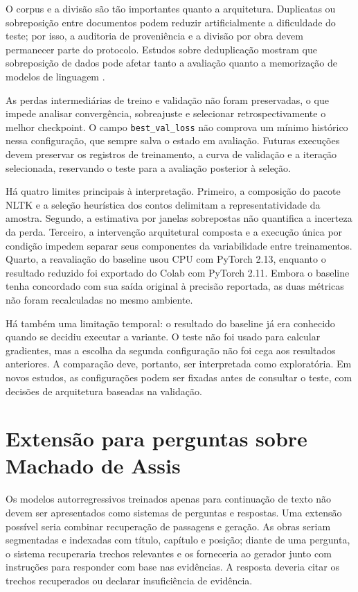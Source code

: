 \documentclass[conference]{IEEEtran}
\begin{document}
O corpus e a divisão são tão importantes quanto a arquitetura. Duplicatas ou sobreposição entre documentos podem reduzir artificialmente a dificuldade do teste; por isso, a auditoria de proveniência e a divisão por obra devem permanecer parte do protocolo. Estudos sobre deduplicação mostram que sobreposição de dados pode afetar tanto a avaliação quanto a memorização de modelos de linguagem \cite{lee2022}.

As perdas intermediárias de treino e validação não foram preservadas, o que impede analisar convergência, sobreajuste e selecionar retrospectivamente o melhor checkpoint. O campo \texttt{best\_val\_loss} não comprova um mínimo histórico nessa configuração, que sempre salva o estado em avaliação. Futuras execuções devem preservar os registros de treinamento, a curva de validação e a iteração selecionada, reservando o teste para a avaliação posterior à seleção.

Há quatro limites principais à interpretação. Primeiro, a composição do pacote NLTK e a seleção heurística dos contos delimitam a representatividade da amostra. Segundo, a estimativa por janelas sobrepostas não quantifica a incerteza da perda. Terceiro, a intervenção arquitetural composta e a execução única por condição impedem separar seus componentes da variabilidade entre treinamentos. Quarto, a reavaliação do baseline usou CPU com PyTorch 2.13, enquanto o resultado reduzido foi exportado do Colab com PyTorch 2.11. Embora o baseline tenha concordado com sua saída original à precisão reportada, as duas métricas não foram recalculadas no mesmo ambiente.

Há também uma limitação temporal: o resultado do baseline já era conhecido quando se decidiu executar a variante. O teste não foi usado para calcular gradientes, mas a escolha da segunda configuração não foi cega aos resultados anteriores. A comparação deve, portanto, ser interpretada como exploratória. Em novos estudos, as configurações podem ser fixadas antes de consultar o teste, com decisões de arquitetura baseadas na validação.

\section{Extensão para perguntas sobre Machado de Assis}

Os modelos autorregressivos treinados apenas para continuação de texto não devem ser apresentados como sistemas de perguntas e respostas. Uma extensão possível seria combinar recuperação de passagens e geração. As obras seriam segmentadas e indexadas com título, capítulo e posição; diante de uma pergunta, o sistema recuperaria trechos relevantes e os forneceria ao gerador junto com instruções para responder com base nas evidências. A resposta deveria citar os trechos recuperados ou declarar insuficiência de evidência.
\end{document}
